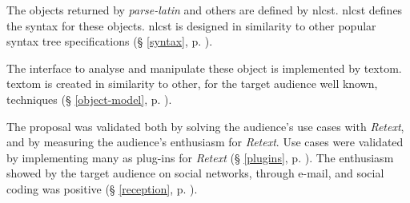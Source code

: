 The objects returned by \emph{parse-latin} and others are defined by
  \acrshort{nlcst}. \acrshort{nlcst} defines the syntax for these objects.
  \acrshort{nlcst} is designed in similarity to other popular syntax tree
  specifications (§ \ref{syntax}, p. \pageref{syntax}).

The interface to analyse and manipulate these object is implemented by
  \gls{textom}. \gls{textom} is created in similarity to other, for the target
  audience well known, techniques
  (§ \ref{object-model}, p. \pageref{object-model}).

The proposal was validated both by solving the audience's use cases with
  \emph{Retext}, and by measuring the audience's enthusiasm for \emph{Retext}.
Use cases were validated by implementing many as plug-ins for
  \emph{Retext} (§ \ref{plugins}, p. \pageref{plugins}).
The enthusiasm showed by the target audience on social networks, through
  e-mail, and social coding was positive
  (§ \ref{reception}, p. \pageref{reception}).

\endgroup
